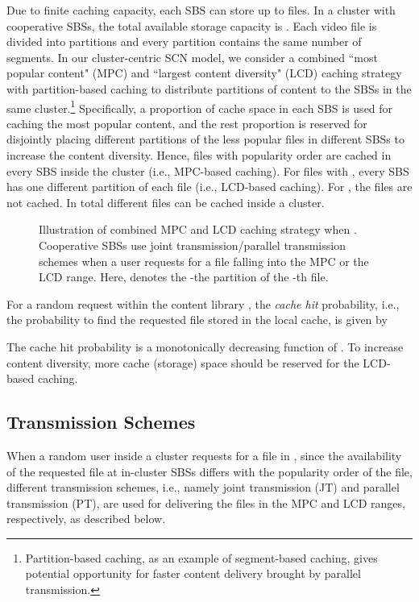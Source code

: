 \documentclass[twocolumns,10pt]{IEEEtran}
\begin{document}
Due to finite caching capacity, each SBS can store up to  files. In a cluster with  cooperative SBSs, the total available storage capacity is . Each video file is divided into  partitions and every partition contains the same number of segments. In our cluster-centric SCN model, we consider a combined ``most popular content" (MPC) and ``largest content diversity" (LCD) caching strategy with partition-based caching \cite{partition_based} to distribute partitions of content to the SBSs in the same cluster.\footnote{Partition-based caching, as an example of segment-based caching, gives potential opportunity for faster content delivery brought by parallel transmission.}
Specifically, a proportion  of cache space in each SBS is used for caching the most popular content, and the rest  proportion is reserved for disjointly placing different partitions of the less popular files in different SBSs to increase the content diversity. Hence, files  with popularity order  are cached in every SBS inside the cluster (i.e., MPC-based caching). For files  with , every SBS has one different partition of each file (i.e., LCD-based caching). For , the files are not cached. In total  different files can be cached inside a cluster. 


\begin{figure}
	\centering
	\caption{Illustration of combined MPC and LCD caching strategy when . Cooperative SBSs use joint transmission/parallel transmission schemes when a user requests for a file falling into the MPC or the LCD range. Here,  denotes the -the partition of the -th file.}
\end{figure}

For a random request within the content library , the {\emph{cache hit}} probability, i.e., the probability to find the requested file stored in the local cache, is given by
 
The cache hit probability is a monotonically decreasing function of . To increase content diversity, more cache (storage) space should be reserved for the LCD-based caching.


\subsection{Transmission Schemes}
\label{section_transmission}
When a random user inside a cluster requests for a file in , since the availability of the requested file at in-cluster SBSs differs with the popularity order of the file, different transmission schemes, i.e., namely joint transmission (JT) and parallel transmission (PT), are used for delivering the files in the MPC and LCD ranges, respectively, as described below. 
\end{document}
